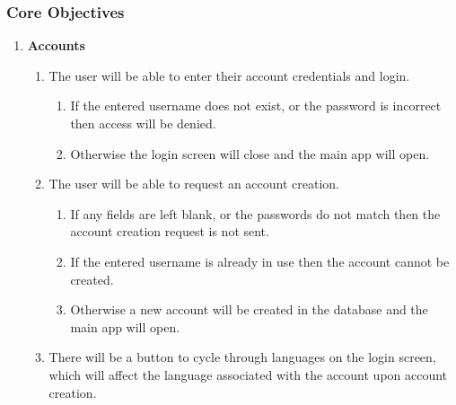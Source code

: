\documentclass{article}
\begin{document}
\subsubsection{Core Objectives}
\begin{enumerate}
    \item {\textbf{Accounts}}
    \begin{enumerate}
        \item The user will be able to enter their account credentials and login.
        \begin{enumerate}
            \item If the entered username does not exist, or the password is incorrect then access will be denied.
            \item Otherwise the login screen will close and the main app will open.
        \end{enumerate}
        \item The user will be able to request an account creation.
        \begin{enumerate}
            \item If any fields are left blank, or the passwords do not match then the account creation request is not sent.
            \item If the entered username is already in use then the account cannot be created.
            \item Otherwise a new account will be created in the database and the main app will open.
        \end{enumerate}
        \item There will be a button to cycle through languages on the login screen, which will affect the language associated with the account upon account creation.
    \end{enumerate}


\end{enumerate}
\end{document}

